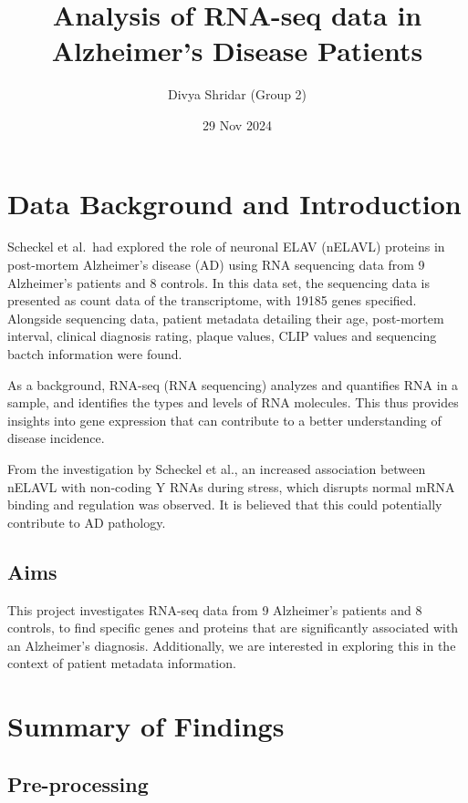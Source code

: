 \documentclass[
]{article}
\title{Analysis of RNA-seq data in Alzheimer's Disease Patients}
\author{Divya Shridar (Group 2)}
\date{29 Nov 2024}
\begin{document}
\maketitle

{
\setcounter{tocdepth}{2}
\tableofcontents
}
\hypertarget{data-background-and-introduction}{%
\section{Data Background and
Introduction}\label{data-background-and-introduction}}

Scheckel et al.~had explored the role of neuronal ELAV (nELAVL) proteins
in post-mortem Alzheimer's disease (AD) using RNA sequencing data from 9
Alzheimer's patients and 8 controls. In this data set, the sequencing
data is presented as count data of the transcriptome, with 19185 genes
specified. Alongside sequencing data, patient metadata detailing their
age, post-mortem interval, clinical diagnosis rating, plaque values,
CLIP values and sequencing bactch information were found.

As a background, RNA-seq (RNA sequencing) analyzes and quantifies RNA in
a sample, and identifies the types and levels of RNA molecules. This
thus provides insights into gene expression that can contribute to a
better understanding of disease incidence.

From the investigation by Scheckel et al., an increased association
between nELAVL with non-coding Y RNAs during stress, which disrupts
normal mRNA binding and regulation was observed. It is believed that
this could potentially contribute to AD pathology.

\hypertarget{aims}{%
\subsection{Aims}\label{aims}}

This project investigates RNA-seq data from 9 Alzheimer's patients and 8
controls, to find specific genes and proteins that are significantly
associated with an Alzheimer's diagnosis. Additionally, we are
interested in exploring this in the context of patient metadata
information.

\hypertarget{summary-of-findings}{%
\section{Summary of Findings}\label{summary-of-findings}}

\hypertarget{pre-processing}{%
\subsection{Pre-processing}\label{pre-processing}}
\end{document}
